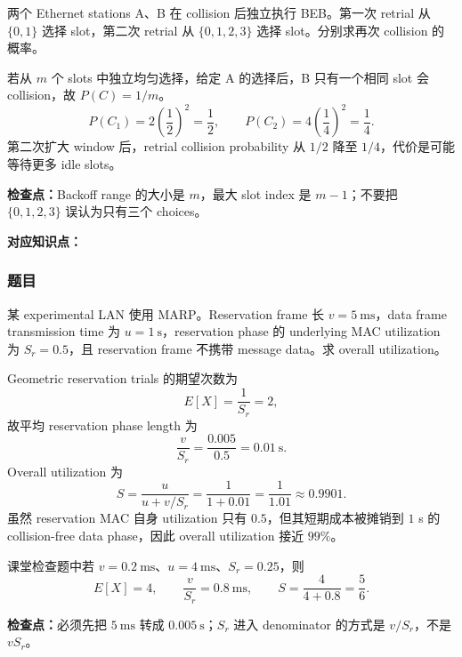 两个 Ethernet stations A、B 在 collision 后独立执行 BEB。第一次 retrial 从 $\{0,1\}$ 选择 slot，第二次 retrial 从 $\{0,1,2,3\}$ 选择 slot。分别求再次 collision 的概率。

\begin{checkedsolution}
若从 $m$ 个 slots 中独立均匀选择，给定 A 的选择后，B 只有一个相同 slot 会 collision，故 $P(C)=1/m$。
\[
  P(C_1)=2\left(\frac12\right)^2=\frac12,
  \qquad
  P(C_2)=4\left(\frac14\right)^2=\frac14.
\]
第二次扩大 window 后，retrial collision probability 从 $1/2$ 降至 $1/4$，代价是可能等待更多 idle slots。
\end{checkedsolution}

\textbf{检查点：}Backoff range 的大小是 $m$，最大 slot index 是 $m-1$；不要把 $\{0,1,2,3\}$ 误认为只有三个 choices。

\clearpage
{}

\textbf{对应知识点：}

\subsubsection*{题目}

某 experimental LAN 使用 MARP。Reservation frame 长 $v=5\ \mathrm{ms}$，data frame transmission time 为 $u=1\ \mathrm{s}$，reservation phase 的 underlying MAC utilization 为 $S_r=0.5$，且 reservation frame 不携带 message data。求 overall utilization。

\begin{checkedsolution}
Geometric reservation trials 的期望次数为
\[
  E[X]=\frac1{S_r}=2,
\]
故平均 reservation phase length 为
\[
  \frac{v}{S_r}=\frac{0.005}{0.5}=0.01\ \mathrm{s}.
\]
Overall utilization 为
\[
  S=\frac{u}{u+v/S_r}
   =\frac{1}{1+0.01}
   =\frac{1}{1.01}
   \approx\boxed{0.9901}.
\]
虽然 reservation MAC 自身 utilization 只有 $0.5$，但其短期成本被摊销到 $1$ s 的 collision-free data phase，因此 overall utilization 接近 $99\%$。

课堂检查题中若 $v=0.2\ \mathrm{ms}$、$u=4\ \mathrm{ms}$、$S_r=0.25$，则
\[
  E[X]=4,\qquad \frac{v}{S_r}=0.8\ \mathrm{ms},\qquad
  S=\frac{4}{4+0.8}=\boxed{\frac56}.
\]
\end{checkedsolution}

\textbf{检查点：}必须先把 $5\ \mathrm{ms}$ 转成 $0.005\ \mathrm{s}$；$S_r$ 进入 denominator 的方式是 $v/S_r$，不是 $vS_r$。
